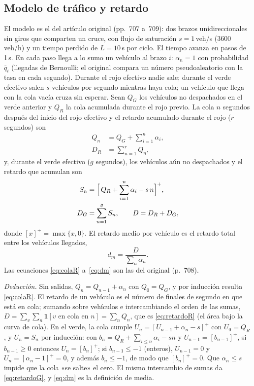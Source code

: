 \documentclass[journal]{IEEEtran}
\newcommand{\qbar}{\bar{q}}   %
\begin{document}
\subsection{Modelo de tráfico y retardo}
\label{ap:colas}
El modelo es el del artículo original (pp.~707 a~709): dos brazos unidireccionales sin giros que comparten un cruce, con flujo de saturación $s=1$\,veh/s (3600\,veh/h) y un tiempo perdido de $L=10$\,s por ciclo. El tiempo avanza en pasos de 1\,s. En cada paso llega a lo sumo un vehículo al brazo $i$: $\alpha_n=1$ con probabilidad $\qbar_i$ (llegadas de Bernoulli; el original compara un número pseudoaleatorio con la tasa en cada segundo). Durante el rojo efectivo nadie sale; durante el verde efectivo salen $s$ vehículos por segundo mientras haya cola; un vehículo que llega con la cola vacía cruza sin esperar. Sean $Q_G$ los vehículos no despachados en el verde anterior y $Q_R$ la cola acumulada durante el rojo previo. La cola $n$ segundos después del inicio del rojo efectivo y el retardo acumulado durante el rojo ($r$ segundos) son
\begin{align}
Q_n &= Q_G+\sum_{i=1}^{n} \alpha_i, \label{eq:colaR}\\
D_R &= \sum_{n=1}^{r} Q_n, \label{eq:retardoR}
\end{align}
y, durante el verde efectivo ($g$ segundos), los vehículos aún no despachados y el retardo que acumulan son
\begin{align}
S_n &= \Bigl[\,Q_R+\sum_{i=1}^{n} \alpha_i-s\,n\Bigr]^{+}, \label{eq:colaG}\\
D_G &= \sum_{n=1}^{g} S_n, \qquad D=D_R+D_G, \label{eq:retardoG}
\end{align}
donde $[x]^{+}=\max\{x,0\}$. El retardo medio por vehículo es el retardo total entre los vehículos llegados,
\begin{equation}
d_m=\frac{D}{\sum_n \alpha_n}.
\label{eq:dm}
\end{equation}
Las ecuaciones \eqref{eq:colaR} a~\eqref{eq:dm} son las del original (p.~708).

\emph{Deducción.} Sin salidas, $Q_n=Q_{n-1}+\alpha_n$ con $Q_0=Q_G$, y por inducción resulta \eqref{eq:colaR}. El retardo de un vehículo es el número de finales de segundo en que está en cola; sumando sobre vehículos e intercambiando el orden de las sumas, $D=\sum_v\sum_n\mathbf{1}[v\text{ en cola en }n]=\sum_n Q_n$, que es \eqref{eq:retardoR} (el área bajo la curva de cola). En el verde, la cola cumple $U_n=[U_{n-1}+\alpha_n-s]^{+}$ con $U_0=Q_R$, y $U_n=S_n$ por inducción: con $b_n=Q_R+\sum_{i\le n}\alpha_i-sn$ y $U_{n-1}=[b_{n-1}]^{+}$, si $b_{n-1}\ge0$ entonces $U_n=[b_n]^{+}$; si $b_{n-1}\le-1$ (enteros), $U_{n-1}=0$ y $U_n=[\alpha_n-1]^{+}=0$, y además $b_n\le-1$, de modo que $[b_n]^{+}=0$. Que $\alpha_n\le s$ impide que la cola «se salte» el cero. El mismo intercambio de sumas da \eqref{eq:retardoG}, y \eqref{eq:dm} es la definición de media.
\end{document}
